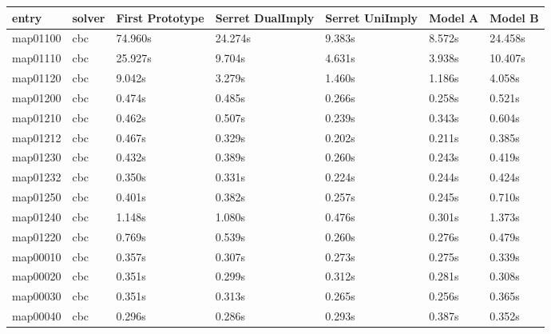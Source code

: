 \begin{table}[H]
\begin{tabular}{|l|l|l|l|l|l|l|}
\hline
\rowcolor[HTML]{C0C0C0} 
entry    & solver     & First Prototype & Serret DualImply & Serret UniImply & Model A & Model B  \\\hline
map01100 & cbc & 74.960s           & 24.274s                 & 9.383s                & 8.572s        & 24.458s       \\\hline
map01110 & cbc & 25.927s          & 9.704s                 & 4.631s                & 3.938s       & 10.407s       \\\hline
map01120 & cbc & 9.042s           & 3.279s                & 1.460s               & 1.186s       & 4.058s        \\\hline
map01200 & cbc & 0.474s         & 0.485s               & 0.266s               & 0.258s       & 0.521s        \\\hline
map01210 & cbc & 0.462s          & 0.507s                & 0.239s              & 0.343s      & 0.604s        \\\hline
map01212 & cbc & 0.467s          & 0.329s                & 0.202s              & 0.211s      & 0.385s       \\\hline
map01230 & cbc & 0.432s          & 0.389s                 & 0.260s              & 0.243s      & 0.419s       \\\hline
map01232 & cbc & 0.350s          & 0.331s               & 0.224s               & 0.244s      & 0.424s      \\ \hline
map01250 & cbc & 0.401s          & 0.382s                & 0.257s              & 0.245s       & 0.710s       \\\hline
map01240 & cbc & 1.148s          & 1.080s                & 0.476s              & 0.301s       & 1.373s        \\\hline
map01220 & cbc & 0.769s          & 0.539s                & 0.260s              & 0.276s       & 0.479s       \\\hline
map00010 & cbc & 0.357s          & 0.307s                & 0.273s               & 0.275s      & 0.339s      \\\hline
map00020 & cbc & 0.351s          & 0.299s                & 0.312s               & 0.281s      & 0.308s      \\\hline
map00030 & cbc & 0.351s         & 0.313s                & 0.265s              & 0.256s       & 0.365s       \\\hline
map00040 & cbc & 0.296s         & 0.286s                & 0.293s               & 0.387s      & 0.352s        \\\hline

\end{tabular}
\end{table}
